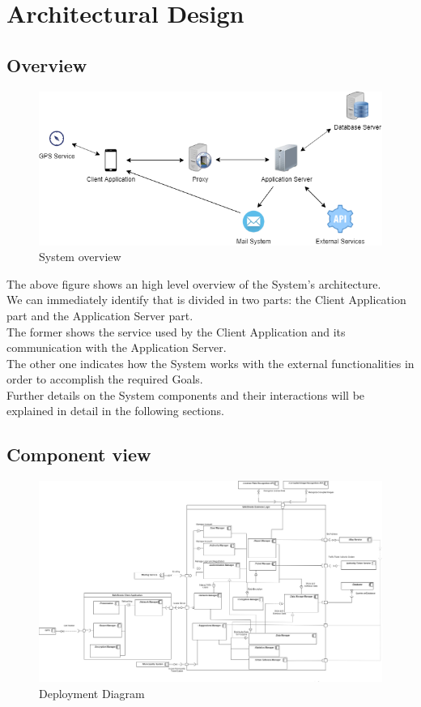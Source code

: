 \section{Architectural Design}

\subsection{Overview}
\begin{figure}[H]
          \includegraphics[scale=0.54,left]{Images/overview.png}
        \caption{System overview}
\end{figure}
The above figure shows an high level overview of the System's architecture.\\
We can immediately identify that is divided in two parts: the Client Application part and the Application Server part.\\
The former shows the service used by the Client Application and its communication with the Application Server.\\
The other one indicates how the System works with the external functionalities in order to accomplish the required Goals.\\
Further details on the System components and their interactions will be explained in detail in the following sections.

\subsection{Component view}


\begin{figure}[H]
\centering
\advance\leftskip-6cm
          \includegraphics[width=1.5\textwidth,left]{Images/Component_view.png}
        \caption{Deployment Diagram}
\end{figure}



